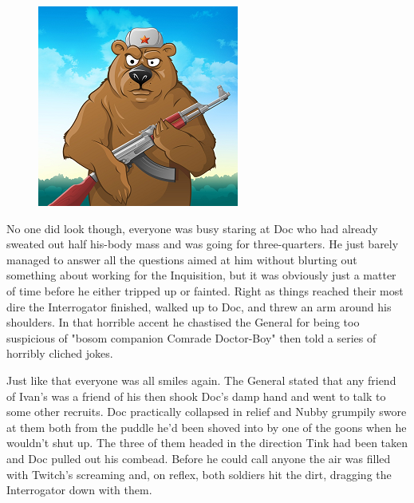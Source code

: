 \begin{figure}
	\begin{center}
		\includegraphics[width=\figwidth]{pics/9/31.png}
	\end{center}
\end{figure}
No one did look though, everyone was busy staring at Doc who had already sweated out half his-body mass and was going for three-quarters. 
He just barely managed to answer all the questions aimed at him without blurting out something about working for the Inquisition, but it was obviously just a matter of time before he either tripped up or fainted. 
Right as things reached their most dire the Interrogator finished, walked up to Doc, and threw an arm around his shoulders. 
In that horrible accent he chastised the General for being too suspicious of "bosom companion Comrade Doctor-Boy" then told a series of horribly cliched jokes.

Just like that everyone was all smiles again. 
The General stated that any friend of Ivan's was a friend of his then shook Doc's damp hand and went to talk to some other recruits. 
Doc practically collapsed in relief and Nubby grumpily swore at them both from the puddle he'd been shoved into by one of the goons when he wouldn't shut up. 
The three of them headed in the direction Tink had been taken and Doc pulled out his combead. 
Before he could call anyone the air was filled with Twitch's screaming and, on reflex, both soldiers hit the dirt, dragging the Interrogator down with them.

